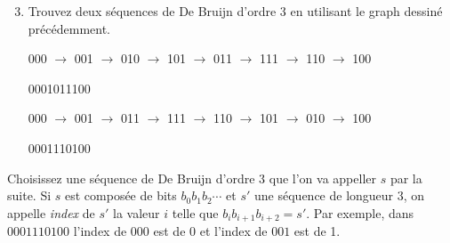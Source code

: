 \documentclass[11pt]{article}
\begin{document}
\begin{enumerate}
\setcounter{enumi}{2}
\item Trouvez deux séquences de De Bruijn d'ordre 3 en utilisant
le graph dessiné précédemment.  


\begin{solution}

000 $\rightarrow$ 001 $\rightarrow$ 010 $\rightarrow$ 101 $\rightarrow$ 011
$\rightarrow$ 111 $\rightarrow$ 110 $\rightarrow$ 100

0001011100

000 $\rightarrow$ 001 $\rightarrow$ 011 $\rightarrow$ 111 $\rightarrow$ 110
$\rightarrow$ 101 $\rightarrow$ 010 $\rightarrow$ 100

0001110100

\end{solution}
\end{enumerate}


Choisissez une séquence de De Bruijn d'ordre 3 que l'on va appeller $s$
par la suite. Si $s$ est composée de bits $b_0b_1b_2\cdots$ et $s'$ une
séquence de longueur 3, on appelle \emph{index} de $s'$ la valeur $i$
telle que $b_ib_{i+1}b_{i+2}=s'$. Par exemple, dans $0001110100$ l'index
de $000$ est de 0 et l'index de $001$ est de 1.
\end{document}
